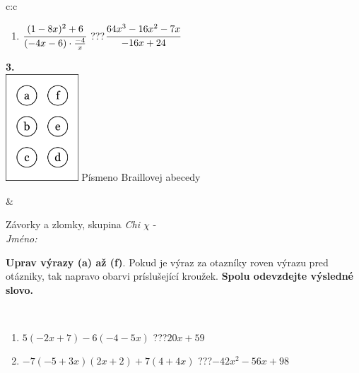 \documentclass[10pt]{report}
\begin{document}
\begin{tabular}{c:c}
\begin{minipage}[c][104.5mm][t]{0.5\linewidth}
\begin{center}
\begin{minipage}{0.79\linewidth}
\begin{center}
\begin{varwidth}{\linewidth}
\begin{enumerate}
\item $\cfrac{(1-8x)^2+6}{(-4x-6)\cdot\frac{-4}{x}}$\quad \dotfill\; ???\;\dotfill \quad $\cfrac{64x^3-16x^2-7x}{-16x+24}$
\end{enumerate}
\end{varwidth}
\end{center}
\end{minipage}
\begin{minipage}{0.20\linewidth}
\begin{center}
{\Huge\bfseries 3.} \\[2mm]
\includegraphics[height=40mm]{../images/braille.png}
{\small Písmeno Braillovej abecedy}
\end{center}
\end{minipage}
\end{center}
\end{minipage}
&
\begin{minipage}[c][104.5mm][t]{0.5\linewidth}
\begin{center}
\vspace{7mm}
{\huge Závorky a zlomky, skupina \textit{Chi $\chi$} -}\\[5mm]
\textit{Jméno:}\phantom{xxxxxxxxxxxxxxxxxxxxxxxxxxxxxxxxxxxxxxxxxxxxxxxxxxxxxxxxxxxxxxxxx}\\[5mm]
\begin{minipage}{0.95\linewidth}
\begin{center}
\textbf{Uprav výrazy (a) až (f)}. Pokud je výraz za otazníky roven výrazu pred otázniky, tak napravo obarvi príslušející kroužek. \textbf{Spolu odevzdejte výsledné slovo.}
\end{center}
\end{minipage}
\\[1mm]
\begin{minipage}{0.79\linewidth}
\begin{center}
\begin{varwidth}{\linewidth}
\begin{enumerate}
\normalsize
\item $5(-2x+7)-6(-4-5x)$\quad \dotfill\; ???\;\dotfill \quad $20x+59$
\item $-7(-5+3x)(2x+2)+7(4+4x)$\quad \dotfill\; ???\;\dotfill \quad $-42x^2-56x+98$

\end{enumerate}
\end{varwidth}
\end{center}
\end{minipage}
\end{center}
\end{minipage}
\end{tabular}
\end{document}
